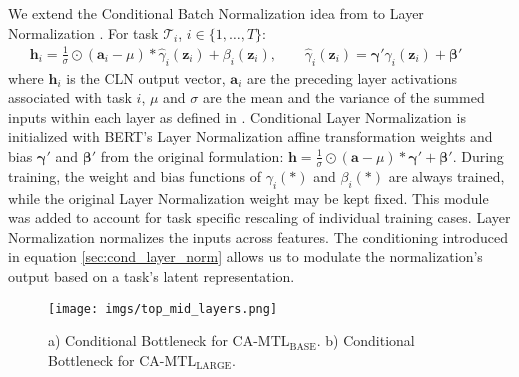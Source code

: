 \documentclass{article} \usepackage{iclr2021_conference,times}
\begin{document}
We extend the Conditional Batch Normalization idea from \citet{NIPS2017_7237} to Layer Normalization \citep{DBLP:journals/corr/BaKH16}. For task $\mathscr{T}_i$, $i \in \{1,\dotsc,T\}$:
\begin{gather}
\label{eqn:cond_layer_norm}
    \textbf{h}_i = \frac{1}{\sigma}\odot(\textbf{a}_i-\mu) * \hat{\gamma}_i(\textbf{z}_i) + \beta_i(\textbf{z}_i), \:\:\: \:\:\: \:\:\:
    \hat{\gamma}_i(\textbf{z}_i) = \boldsymbol{\gamma}'\gamma_i(\textbf{z}_i) + \boldsymbol{\beta}' \:\:\: \:\:\: \:\:\:
\end{gather}
where $\textbf{h}_i$ is the CLN output vector, $\textbf{a}_i$ are the preceding layer activations associated with task $i$, $\mu$ and $\sigma$ are the mean and the variance of the summed inputs within each layer as defined in \citet{DBLP:journals/corr/BaKH16}. Conditional Layer Normalization is initialized with BERT's Layer Normalization affine transformation weights and bias $\boldsymbol{\gamma}'$ and $\boldsymbol{\beta}'$ from the original formulation: $\textbf{h} = \frac{1}{\sigma}\odot(\textbf{a}-\mu) * \boldsymbol{\gamma}'+ \boldsymbol{\beta}'$. During training, the weight and bias functions of $\gamma_i(*)$ and $\beta_i(*)$ are always trained, while the original Layer Normalization weight may be kept fixed. This module was added to account for task specific rescaling of individual training cases. Layer Normalization normalizes the inputs across features. The conditioning introduced in equation \ref{sec:cond_layer_norm} allows us to modulate the normalization's output based on a task's latent representation.

\begin{wrapfigure}[13]{r}{0.40\textwidth}
    \vspace{-40pt}
    \begin{center} 
        \texttt{[image: imgs/top\_mid\_layers.png]}
    \caption{\label{fig:modules} \small a) Conditional Bottleneck for $\text{CA-MTL}_{\text{BASE}}$. b) Conditional Bottleneck for $\text{CA-MTL}_{\text{LARGE}}$.}
 \hspace{-5pt}
    \end{center}
\end{wrapfigure}
\end{document}
